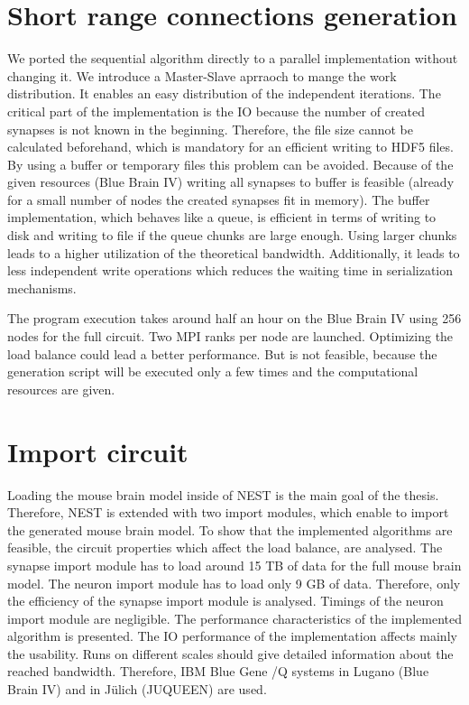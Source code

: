 \section{Short range connections generation}
We ported the sequential algorithm directly to a parallel implementation without changing it.
We introduce a Master-Slave aprraoch to mange the work distribution.
It enables an easy distribution of the independent iterations.
The critical part of the implementation is the IO because the number of created synapses is not known in the beginning.
Therefore, the file size cannot be calculated beforehand, which is mandatory for an efficient writing to HDF5 files. 
By using a buffer or temporary files this problem can be avoided.
Because of the given resources (Blue Brain IV)
writing all synapses to buffer is feasible (already for a small number of nodes the created synapses fit in memory).
The buffer implementation, which behaves like a queue, is efficient in terms of writing to disk and writing to file
if the queue chunks are large enough. Using larger chunks leads to 
a higher utilization of the theoretical bandwidth. Additionally, it leads to less independent
write operations which reduces the waiting time in serialization mechanisms.

The program execution takes around half an hour on the Blue Brain IV using 256 nodes for the full circuit.
Two MPI ranks per node are launched. Optimizing the load balance could lead a better performance.
But is not feasible, because the generation script will be executed only a few times
and the computational resources are given.

\section{Import circuit}
Loading the mouse brain model inside of NEST is the main goal of the thesis.
Therefore, NEST is extended with two import modules, which enable to import the
generated mouse brain model. To show that the implemented algorithms are feasible, 
the circuit properties which affect the load balance, are analysed.
The synapse import module has to load around 15 TB of data for the full mouse brain model.
The neuron import module has to load only 9 GB of data.
Therefore, only the efficiency of the synapse import module is analysed.
Timings of the neuron import module are negligible.
The performance characteristics of the implemented algorithm is presented.
The IO performance of the implementation affects mainly the usability.
Runs on different scales should give detailed information about the reached bandwidth.
Therefore, IBM Blue Gene /Q systems in Lugano (Blue Brain IV) and in J\"{u}lich (JUQUEEN) are used.

